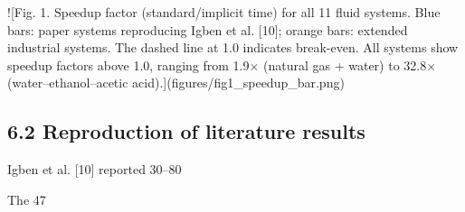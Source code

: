\documentclass[review,3p]{elsarticle}
\begin{document}
![Fig. 1. Speedup factor (standard/implicit time) for all 11 fluid systems. Blue bars: paper systems reproducing Igben et al. [10]; orange bars: extended industrial systems. The dashed line at 1.0 indicates break-even. All systems show speedup factors above 1.0, ranging from 1.9× (natural gas + water) to 32.8× (water–ethanol–acetic acid).](figures/fig1_speedup_bar.png)

\subsection{6.2 Reproduction of literature results}

Igben et al. [10] reported 30–80%

The 47%
\end{document}
